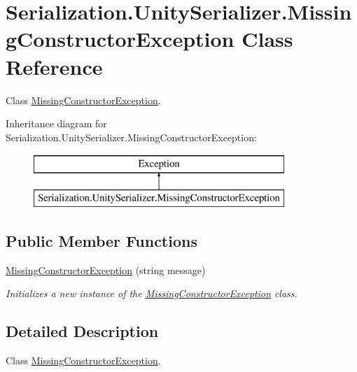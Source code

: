 \hypertarget{class_serialization_1_1_unity_serializer_1_1_missing_constructor_exception}{}\section{Serialization.\+Unity\+Serializer.\+Missing\+Constructor\+Exception Class Reference}
\label{class_serialization_1_1_unity_serializer_1_1_missing_constructor_exception}


Class \hyperlink{class_serialization_1_1_unity_serializer_1_1_missing_constructor_exception}{Missing\+Constructor\+Exception}.  


Inheritance diagram for Serialization.\+Unity\+Serializer.\+Missing\+Constructor\+Exception\+:\begin{figure}[H]
\begin{center}
\leavevmode
\includegraphics[height=2.000000cm]{class_serialization_1_1_unity_serializer_1_1_missing_constructor_exception}
\end{center}
\end{figure}
\subsection*{Public Member Functions}
\begin{DoxyCompactItemize}
\item 
\hyperlink{class_serialization_1_1_unity_serializer_1_1_missing_constructor_exception_abe6acc36e1c08845f4c41e3aecb243b9}{Missing\+Constructor\+Exception} (string message)
\begin{DoxyCompactList}\small\item\em Initializes a new instance of the \hyperlink{class_serialization_1_1_unity_serializer_1_1_missing_constructor_exception}{Missing\+Constructor\+Exception} class. \end{DoxyCompactList}\end{DoxyCompactItemize}


\subsection{Detailed Description}
Class \hyperlink{class_serialization_1_1_unity_serializer_1_1_missing_constructor_exception}{Missing\+Constructor\+Exception}. 

